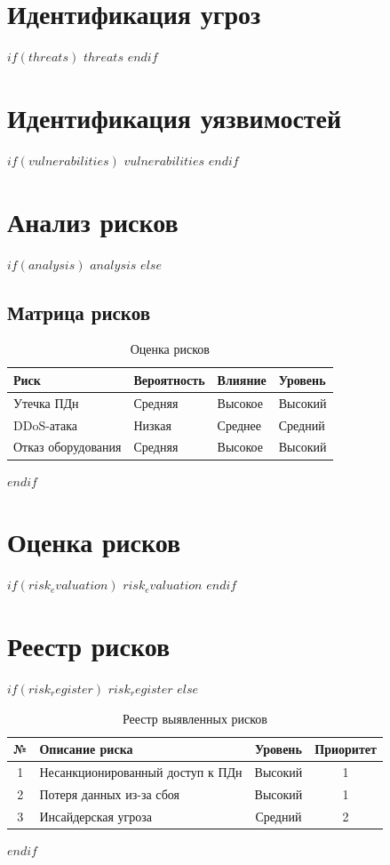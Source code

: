 \documentclass[14pt,a4paper]{extarticle}
\begin{document}
\section{Идентификация угроз}
\label{sec:threats}

$if(threats)$
$threats$
$endif$

\section{Идентификация уязвимостей}
\label{sec:vulnerabilities}

$if(vulnerabilities)$
$vulnerabilities$
$endif$

\section{Анализ рисков}
\label{sec:analysis}

$if(analysis)$
$analysis$
$else$
\subsection{Матрица рисков}
\begin{table}[h]
\centering
\caption{Оценка рисков}
\begin{tabular}{|l|l|l|l|}
\hline
\textbf{Риск} & \textbf{Вероятность} & \textbf{Влияние} & \textbf{Уровень} \\
\hline
Утечка ПДн & Средняя & Высокое & Высокий \\
DDoS-атака & Низкая & Среднее & Средний \\
Отказ оборудования & Средняя & Высокое & Высокий \\
\hline
\end{tabular}
\end{table}
$endif$

\section{Оценка рисков}
\label{sec:risk_evaluation}

$if(risk_evaluation)$
$risk_evaluation$
$endif$

\section{Реестр рисков}
\label{sec:risk_register}

$if(risk_register)$
$risk_register$
$else$
\begin{table}[h]
\centering
\caption{Реестр выявленных рисков}
\begin{tabular}{|c|p{6cm}|c|c|}
\hline
\textbf{№} & \textbf{Описание риска} & \textbf{Уровень} & \textbf{Приоритет} \\
\hline
1 & Несанкционированный доступ к ПДн & Высокий & 1 \\
2 & Потеря данных из-за сбоя & Высокий & 1 \\
3 & Инсайдерская угроза & Средний & 2 \\
\hline
\end{tabular}
\end{table}
$endif$
\end{document}
